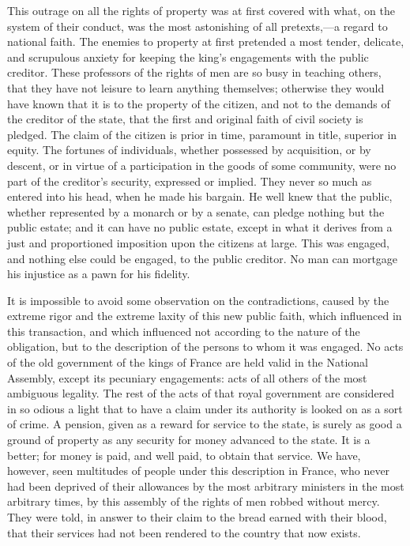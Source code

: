 This outrage on all the rights of property was at first covered with what, on the system of their conduct, was the most astonishing of all pretexts,—a regard to national faith. The enemies to property at first pretended a most tender, delicate, and scrupulous anxiety for keeping the king's engagements with the public creditor. These professors of the rights of men are so busy in teaching others, that they have not leisure to learn anything themselves; otherwise they would have known that it is to the property of the citizen, and not to the demands of the creditor of the state, that the first and original faith of civil society is pledged. The claim of the citizen is prior in time, paramount in title, superior in equity. The fortunes of individuals, whether possessed by acquisition, or by descent, or in virtue of a participation in the goods of some community, were no part of the creditor's security, expressed or implied. They never so much as entered into his head, when he made his bargain. He well knew that the public, whether represented by a monarch or by a senate, can pledge nothing but the public estate; and it can have no public estate, except in what it derives from a just and proportioned imposition upon the citizens at large. This was engaged, and nothing else could be engaged, to the public creditor. No man can mortgage his injustice as a pawn for his fidelity.

It is impossible to avoid some observation on the contradictions, caused by the extreme rigor and the extreme laxity of this new public faith, which influenced in this transaction, and which influenced not according to the nature of the obligation, but to the description of the persons to whom it was engaged. No acts of the old government of the kings of France are held valid in the National Assembly, except its pecuniary engagements: acts of all others of the most ambiguous legality. The rest of the acts of that royal government are considered in so odious a light that to have a claim under its authority is looked on as a sort of crime. A pension, given as a reward for service to the state, is surely as good a ground of property as any security for money advanced to the state. It is a better; for money is paid, and well paid, to obtain that service. We have, however, seen multitudes of people under this description in France, who never had been deprived of their allowances by the most arbitrary ministers in the most arbitrary times, by this assembly of the rights of men robbed without mercy. They were told, in answer to their claim to the bread earned with their blood, that their services had not been rendered to the country that now exists.

